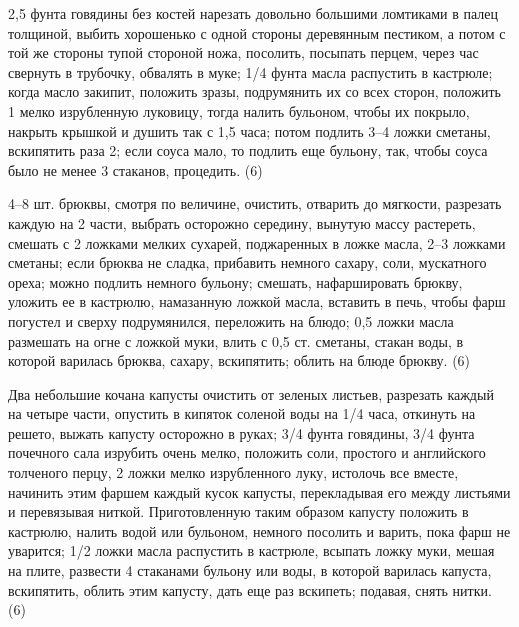 
2,5 фунта говядины без костей нарезать довольно большими ломтиками в палец толщиной, выбить хорошенько с одной стороны деревянным пестиком, а потом с той же стороны тупой стороной ножа, посолить, посыпать перцем, через час свернуть в трубочку, обвалять в муке; 1/4 фунта масла распустить в кастрюле; когда масло закипит, положить зразы, подрумянить их со всех сторон, положить 1 мелко изрубленную луковицу, тогда налить бульоном, чтобы их покрыло, накрыть крышкой и душить так с 1,5 часа; потом подлить 3--4 ложки сметаны, вскипятить раза 2; если соуса мало, то подлить еще бульону, так, чтобы соуса было не менее 3 стаканов, процедить. (6) 


4--8 шт. брюквы, смотря по величине, очистить, отварить до мягкости, разрезать каждую на 2 части, выбрать осторожно середину, вынутую массу растереть, смешать с 2 ложками мелких сухарей, поджаренных в ложке масла, 2--3 ложками сметаны; если брюква не сладка, прибавить немного сахару, соли, мускатного ореха; можно подлить немного бульону; смешать, нафаршировать брюкву, уложить ее в кастрюлю, намазанную ложкой масла, вставить в печь, чтобы фарш погустел и сверху подрумянился, переложить на блюдо; 0,5 ложки масла размешать на огне с ложкой муки, влить с 0,5 ст. сметаны, стакан воды, в которой варилась брюква, сахару, вскипятить; облить на блюде брюкву. (6) 


Два небольшие кочана капусты очистить от зеленых листьев, разрезать каждый на четыре части, опустить в кипяток соленой воды на 1/4 часа, откинуть на решето, выжать капусту осторожно в руках; 3/4 фунта говядины, 3/4 фунта почечного сала изрубить очень мелко, положить соли, простого и английского толченого перцу, 2 ложки мелко изрубленного луку, истолочь все вместе, начинить этим фаршем каждый кусок капусты, перекладывая его между листьями и перевязывая ниткой. Приготовленную таким образом капусту положить в кастрюлю, налить водой или бульоном, немного посолить и варить, пока фарш не уварится; 1/2 ложки масла распустить в кастрюле, всыпать ложку муки, мешая на плите, развести 4 стаканами бульону или воды, в которой варилась капуста, вскипятить, облить этим капусту, дать еще раз вскипеть; подавая, снять нитки. (6) 


